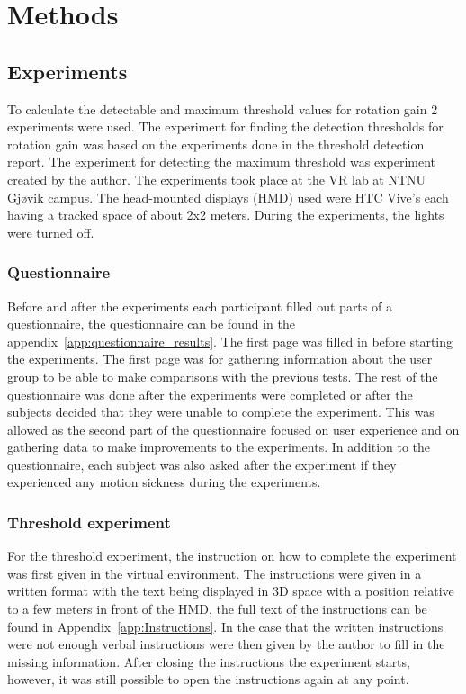 \chapter{Methods}
\label{chap:methods}

\section{Experiments}
To calculate the detectable and maximum threshold values for rotation gain 2 experiments were used. The experiment for finding the detection thresholds for rotation gain was based on the experiments done in the threshold detection report\cite{steinicke2010estimation}. The experiment for detecting the maximum threshold was experiment created by the author. The experiments took place at the VR lab at NTNU Gj\o{}vik campus. The head-mounted displays (HMD) used were HTC Vive's each having a tracked space of about 2x2 meters. During the experiments, the lights were turned off.

\subsection{Questionnaire}
Before and after the experiments each participant filled out parts of a questionnaire, the questionnaire can be found in the appendix~\ref{app:questionnaire_results}. The first page was filled in before starting the experiments. The first page was for gathering information about the user group to be able to make comparisons with the previous tests. The rest of the questionnaire was done after the experiments were completed or after the subjects decided that they were unable to complete the experiment. This was allowed as the second part of the questionnaire focused on user experience and on gathering data to make improvements to the experiments. In addition to the questionnaire, each subject was also asked after the experiment if they experienced any motion sickness during the experiments.

\subsection{Threshold experiment}
For the threshold experiment, the instruction on how to complete the experiment was first given in the virtual environment. The instructions were given in a written format with the text being displayed in 3D space with a position relative to a few meters in front of the HMD, the full text of the instructions can be found in Appendix~\ref{app:Instructions}. In the case that the written instructions were not enough verbal instructions were then given by the author to fill in the missing information. After closing the instructions the experiment starts, however, it was still possible to open the instructions again at any point.
\bigskip

